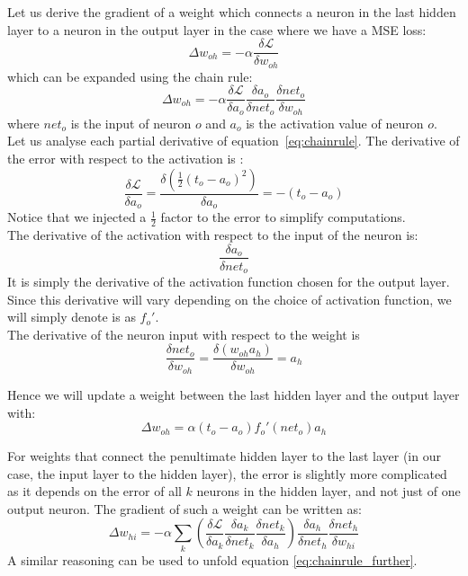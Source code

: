 Let us derive the gradient of a weight which connects a neuron in the 
last hidden layer to a neuron in the output layer in the case
where we have a MSE loss:
$$ \Delta w_{oh} = -\alpha\frac{\delta\mathcal{L}}{\delta w_{oh}}$$
which can be expanded using the chain rule:
\begin{equation}
\Delta w_{oh} = -\alpha
\frac{\delta\mathcal{L}}{\delta a_o}
\frac{\delta a_o}{\delta net_o}
\frac{\delta net_o}{\delta w_{oh}}
	\label{eq:chainrule}
\end{equation}
where $net_o$ is the input of neuron $o$ and $a_o$ is the activation value
of neuron $o$.\\

Let us analyse each partial derivative of equation~\ref{eq:chainrule}.
The derivative of the error with respect to the activation is :
$$ \frac{\delta\mathcal{L}}{\delta a_o} = 
\frac{\delta(\frac{1}{2}(t_o-a_o)^2)}{\delta a_o} = -(t_o-a_o)$$
Notice that we injected a $\frac{1}{2}$ factor to the error to simplify 
computations.\\

The derivative of the activation with respect to the input of the neuron is:
$$ \frac{\delta a_o}{\delta net_o} $$
It is simply the derivative of the activation function chosen for
the output layer. Since this derivative will vary depending on the choice
of activation function, we will simply denote is as $f_o'$.\\


The derivative of the neuron input with respect to the weight is
$$ \frac{\delta net_o}{\delta w_{oh}} = \frac{\delta (w_{oh}a_h)}{\delta w_{oh}}
 = a_h$$

Hence we will update a weight between the last hidden layer and the output
layer with:
$$ \Delta w_{oh} = \alpha (t_o-a_o)f_o'(net_o)a_h$$

For weights that connect the penultimate hidden layer to the last layer (in
our case, the input layer to the hidden layer), the error is slightly more 
complicated as it depends on the error of all $k$ neurons in the hidden layer,
and not just of one output neuron. The gradient of such a weight can be
written as:
\begin{equation}
\Delta w_{hi} = -\alpha
	\sum\limits_k \left(
	\frac{\delta\mathcal{L}}{\delta a_k}
	\frac{\delta a_k}{\delta net_k}
	\frac{\delta net_k}{\delta a_h}
	\right)
\frac{\delta a_h}{\delta net_h}
\frac{\delta net_h}{\delta w_{hi}}
	\label{eq:chainrule_further}
\end{equation}
A similar reasoning can be used to unfold equation \ref{eq:chainrule_further}.

